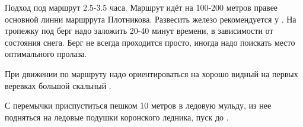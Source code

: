 Подход под маршрут 2.5-3.5 часа. Маршрут идёт на 100-200 метров правее
основной линни маршррута Плотникова. Развесить железо рекомендуется у
. На тропежку под
берг надо заложить 20-40 минут времени, в зависимости от состояния
снега. Берг не всегда проходится просто, иногда надо поискать место
оптимального пролаза.

При движении по маршруту надо ориентироваться на хорошо видный на
первых веревках большой скальный
.


С перемычки приспуститься пешком 10 метров в ледовую мульду, из нее
подняться на ледовые подушки коронского ледника, пуск до
.
